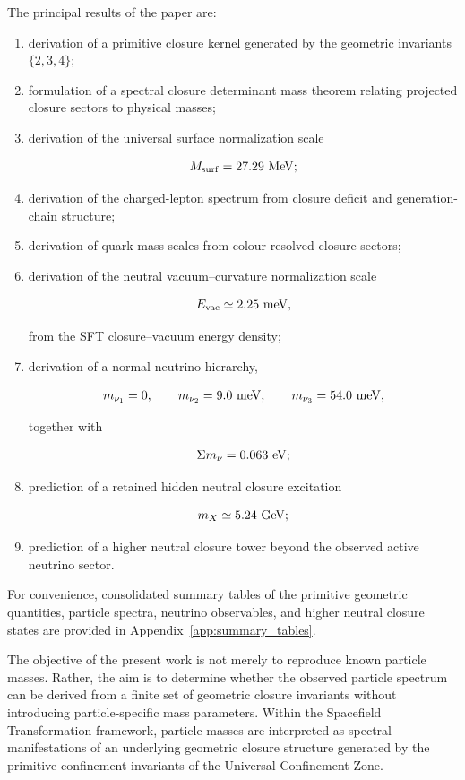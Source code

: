\documentclass[11pt]{article}
\theoremstyle{definition}
\theoremstyle{remark}
\begin{document}
The principal results of the paper are:

\begin{enumerate}

\item derivation of a primitive closure kernel generated by the
geometric invariants \(\{2,3,4\}\);

\item formulation of a spectral closure determinant mass
theorem relating projected closure sectors to physical masses;

\item derivation of the universal surface normalization scale

\[
M_{\rm surf}
=
27.29~{\rm MeV};
\]

\item derivation of the charged-lepton spectrum from closure
deficit and generation-chain structure;

\item derivation of quark mass scales from colour-resolved
closure sectors;

\item derivation of the neutral vacuum--curvature
normalization scale

\[
E_{\rm vac}
\simeq
2.25~{\rm meV},
\]

from the SFT closure--vacuum energy density;

\item derivation of a normal neutrino hierarchy,

\[
m_{\nu_1}=0,
\qquad
m_{\nu_2}=9.0~{\rm meV},
\qquad
m_{\nu_3}=54.0~{\rm meV},
\]

together with

\[
\Sigma m_\nu =
0.063~{\rm eV};
\]

\item prediction of a retained hidden neutral closure
excitation

\[
m_X
\simeq
5.24~{\rm GeV};
\]

\item prediction of a higher neutral closure tower beyond the
observed active neutrino sector.

\end{enumerate}

For convenience, consolidated summary tables of the primitive
geometric quantities, particle spectra, neutrino observables,
and higher neutral closure states are provided in
Appendix~\ref{app:summary_tables}.

The objective of the present work is not merely to reproduce
known particle masses. Rather, the aim is to determine whether
the observed particle spectrum can be derived from a finite set
of geometric closure invariants without introducing
particle-specific mass parameters. Within the Spacefield
Transformation framework, particle masses are interpreted as
spectral manifestations of an underlying geometric closure
structure generated by the primitive confinement invariants of
the Universal Confinement Zone.
\end{document}

